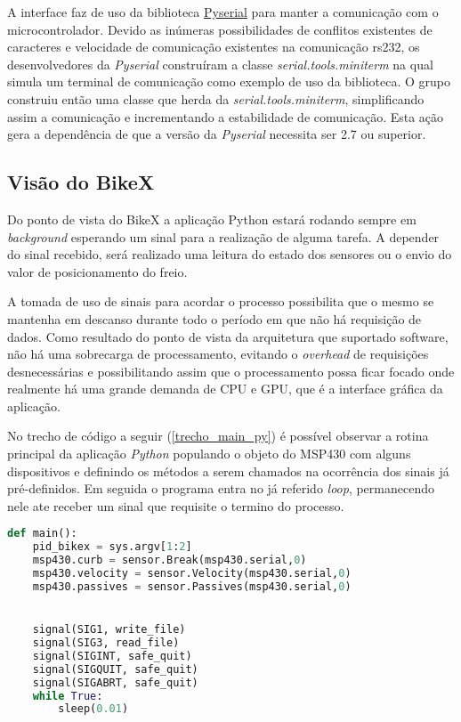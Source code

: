 A interface faz de uso da biblioteca \href{http://pyserial.sourceforge.net/pyserial.html}{Pyserial} para manter a comunicação com o microcontrolador. Devido as inúmeras possibilidades de conflitos existentes de caracteres e velocidade de comunicação existentes na comunicação \gls{rs232}, os desenvolvedores da \textit{Pyserial} construíram a classe \textit{serial.tools.miniterm} na qual simula um terminal de comunicação como exemplo de uso da biblioteca. O grupo construiu então uma classe que herda da \textit{serial.tools.miniterm}, simplificando assim a comunicação e incrementando a estabilidade de comunicação. Esta ação gera a dependência de que a versão da \textit{Pyserial} necessita ser 2.7 ou superior.

\subsection{Visão do BikeX} %
\label{sub:vis_o_do_bikex}

Do ponto de vista do BikeX a aplicação Python estará rodando sempre em \textit{background} esperando um sinal para a realização de alguma tarefa. A depender do sinal recebido, será realizado uma leitura do estado dos sensores ou o envio do valor de posicionamento do freio.

A tomada de uso de sinais para acordar o processo possibilita que o mesmo se mantenha em descanso durante todo o período em que não há requisição de dados. Como resultado do ponto de vista da arquitetura que suportado software, não há uma sobrecarga de processamento, evitando o \textit{overhead} de requisições desnecessárias e possibilitando assim que o processamento possa ficar focado onde realmente há uma grande demanda de CPU e GPU, que é a interface gráfica da aplicação.

No trecho de código a seguir (\ref{trecho_main_py}) é possível observar a rotina principal da aplicação \textit{Python} populando o objeto do MSP430 com alguns dispositivos e definindo os métodos a serem chamados na ocorrência dos sinais já pré-definidos. Em seguida o programa entra no já referido \textit{loop}, permanecendo nele ate receber um sinal que requisite o termino do processo.

\begin{lstlisting}[language=Python,caption={Trecho da rotina principal do script Python},label=trecho_main_py]
def main():
    pid_bikex = sys.argv[1:2]
    msp430.curb = sensor.Break(msp430.serial,0)
    msp430.velocity = sensor.Velocity(msp430.serial,0)
    msp430.passives = sensor.Passives(msp430.serial,0)


    signal(SIG1, write_file)
    signal(SIG3, read_file)
    signal(SIGINT, safe_quit)
    signal(SIGQUIT, safe_quit)
    signal(SIGABRT, safe_quit)
    while True:
        sleep(0.01)

\end{lstlisting}


